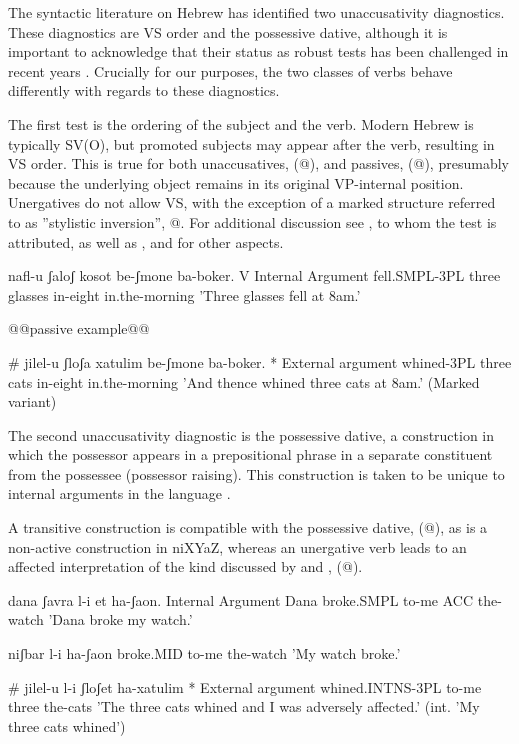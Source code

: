 The syntactic literature on Hebrew has identified two unaccusativity diagnostics. These diagnostics are VS order and the possessive dative, although it is important to acknowledge that their status as robust tests has been challenged in recent years \citep{gafter14li,linzen14pd,kastner17gjgl}. Crucially for our purposes, the two classes of verbs behave differently with regards to these diagnostics.

The first test is the ordering of the subject and the verb. Modern Hebrew is typically SV(O), but promoted subjects may appear after the verb, resulting in VS order. This is true for both unaccusatives, (@), and passives, (@), presumably because the underlying object remains in its original VP-internal position. Unergatives do not allow VS, with the exception of a marked structure referred to as ''stylistic inversion'', @. For additional discussion see \cite{shlonsky87}, to whom the test is attributed, as well as \cite{shlonskydoron91}, \cite{borer95} and \cite{preminger10} for other aspects.

nafl-u ʃaloʃ kosot be-ʃmone ba-boker.         V Internal Argument
     fell.SMPL-3PL three glasses in-eight in.the-morning
     'Three glasses fell at 8am.'
    
    @@passive example@@

     \# jilel-u ʃloʃa xatulim be-ʃmone ba-boker.    * External argument
         whined-3PL three cats in-eight in.the-morning
        'And thence whined three cats at 8am.' (Marked variant)
   
The second unaccusativity diagnostic is the possessive dative, a construction in which the possessor appears in a prepositional phrase in a separate constituent from the possessee (possessor raising). This construction is taken to be unique to internal arguments in the language \citep{borergrodzinsky86}.

A transitive construction is compatible with the possessive dative, (@), as is a non-active construction in niXYaZ, whereas an unergative verb leads to an affected interpretation of the kind discussed by \cite{arieletal15} and \cite{barashersiegalboneh16}, (@). 

dana ʃavra l-i et ha-ʃaon.        Internal Argument
 Dana broke.SMPL to-me ACC the-watch
 'Dana broke my watch.'

      niʃbar l-i ha-ʃaon
         broke.MID to-me the-watch
         'My watch broke.'
                 
        \# jilel-u l-i ʃloʃet ha-xatulim        * External argument
         whined.INTNS-3PL to-me three the-cats
         'The three cats whined and I was adversely affected.' (int. 'My three cats whined')
   
